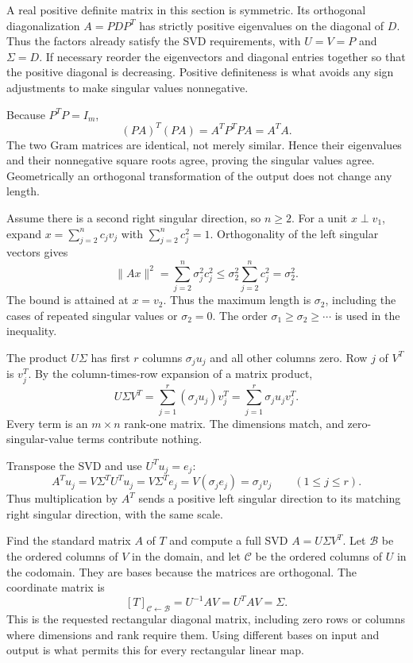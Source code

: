 A real positive definite matrix in this section is symmetric. Its orthogonal diagonalization $A=PDP^T$ has strictly positive eigenvalues on the diagonal of $D$. Thus the factors already satisfy the SVD requirements, with $U=V=P$ and $\Sigma=D$. If necessary reorder the eigenvectors and diagonal entries together so that the positive diagonal is decreasing. Positive definiteness is what avoids any sign adjustments to make singular values nonnegative.

Because $P^TP=I_m$,
\[
(PA)^T(PA)=A^TP^TPA=A^TA.
\]
The two Gram matrices are identical, not merely similar. Hence their eigenvalues and their nonnegative square roots agree, proving the singular values agree. Geometrically an orthogonal transformation of the output does not change any length.

Assume there is a second right singular direction, so $n\ge2$. For a unit $x\perp v_1$, expand $x=\sum_{j=2}^n c_jv_j$ with $\sum_{j=2}^n c_j^2=1$. Orthogonality of the left singular vectors gives
\[
\|Ax\|^2=\sum_{j=2}^n\sigma_j^2c_j^2
\le\sigma_2^2\sum_{j=2}^n c_j^2=\sigma_2^2.
\]
The bound is attained at $x=v_2$. Thus the maximum length is $\sigma_2$, including the cases of repeated singular values or $\sigma_2=0$. The order $\sigma_1\ge\sigma_2\ge\cdots$ is used in the inequality.

The product $U\Sigma$ has first $r$ columns $\sigma_ju_j$ and all other columns zero. Row $j$ of $V^T$ is $v_j^T$. By the column-times-row expansion of a matrix product,
\[
U\Sigma V^T=\sum_{j=1}^r(\sigma_ju_j)v_j^T
=\sum_{j=1}^r\sigma_ju_jv_j^T.
\]
Every term is an $m\times n$ rank-one matrix. The dimensions match, and zero-singular-value terms contribute nothing.

Transpose the SVD and use $U^Tu_j=e_j$:
\[
A^Tu_j=V\Sigma^TU^Tu_j=V\Sigma^Te_j
=V(\sigma_je_j)=\sigma_jv_j\qquad(1\le j\le r).
\]
Thus multiplication by $A^T$ sends a positive left singular direction to its matching right singular direction, with the same scale.

Find the standard matrix $A$ of $T$ and compute a full SVD $A=U\Sigma V^T$. Let $\mathcal B$ be the ordered columns of $V$ in the domain, and let $\mathcal C$ be the ordered columns of $U$ in the codomain. They are bases because the matrices are orthogonal. The coordinate matrix is
\[
[T]_{\mathcal C\leftarrow\mathcal B}=U^{-1}AV=U^TAV=\Sigma.
\]
This is the requested rectangular diagonal matrix, including zero rows or columns where dimensions and rank require them. Using different bases on input and output is what permits this for every rectangular linear map.

